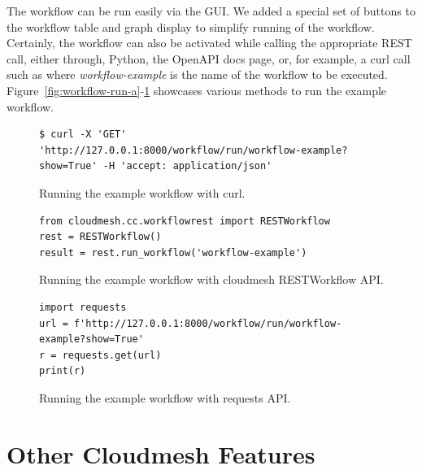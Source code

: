 The workflow can be run easily via the GUI. We added a special set of
buttons to the workflow table and graph display to simplify running of
the workflow.  Certainly, the workflow can also be activated while
calling the appropriate REST call, either through, Python, the OpenAPI
docs page, or, for example, a curl call such as where {\em
workflow-example} is the name of the workflow to be
executed. Figure~\ref{fig:workflow-run-a}-\ref{fig:workflow-run-c}
showcases various methods to run the example workflow.


\begin{figure}[htb]

\begin{verbatim}
$ curl -X 'GET' 'http://127.0.0.1:8000/workflow/run/workflow-example?show=True' -H 'accept: application/json'
\end{verbatim}
\flushleft
\caption{\parindent0pt Running the example workflow with curl.}
\label{fig:workflow-run-a}
\bigskip

\begin{verbatim} 
from cloudmesh.cc.workflowrest import RESTWorkflow
rest = RESTWorkflow()
result = rest.run_workflow('workflow-example')
\end{verbatim}
\caption{Running the example workflow with cloudmesh RESTWorkflow API.}
\label{fig:workflow-run-b}
\bigskip

\begin{verbatim}
import requests
url = f'http://127.0.0.1:8000/workflow/run/workflow-example?show=True'
r = requests.get(url)
print(r)
\end{verbatim}

\caption{Running the example workflow with requests API.}
\label{fig:workflow-run-c}

\end{figure}









% 


\section{Other Cloudmesh Features}

